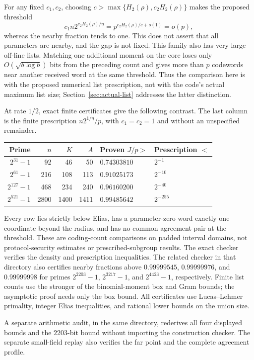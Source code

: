 For any fixed $c_1,c_2$, choosing
$c>\max\{H_2(\rho),c_2H_2(\rho)\}$ makes the proposed threshold
\[
 c_1n2^{c_2H_2(\rho)/\eta}=p^{c_2H_2(\rho)/c+o(1)}=o(p),
\]
whereas the nearby fraction tends to one. This does not assert that
all parameters are nearby, and the gap is not fixed.
This family also has very large off-line lists. Matching one additional
moment on the core loses only $O(\sqrt{b\log b})$ bits from the preceding
count and gives more than $p$ codewords near another received word at
the same threshold. Thus the comparison here is with the proposed
numerical list prescription, not with the code's actual maximum list
size; Section~\ref{sec:actual-list} addresses the latter distinction.

At rate $1/2$, exact finite certificates give the following contrast.
The last column is the finite prescription $n2^{1/\eta}/p$, with
$c_1=c_2=1$ and without an unspecified remainder.
\begin{center}
\begin{tabular}{@{}rrrrll@{}}
\toprule
Prime & $n$ & $K$ & $A$ & Proven $J/p>$ & Prescription $<$\\
\midrule
$2^{31}-1$&92&46&50&$0.74303810$&$2^{-1}$\\
$2^{61}-1$&216&108&113&$0.91025173$&$2^{-10}$\\
$2^{127}-1$&468&234&240&$0.96160200$&$2^{-40}$\\
$2^{521}-1$&2800&1400&1411&$0.99485642$&$2^{-255}$\\
\bottomrule
\end{tabular}
\end{center}
Every row lies strictly below Elias, has a parameter-zero word exactly
one coordinate beyond the radius, and has no common agreement pair at
the threshold. These are coding-count comparisons on padded interval
domains, not protocol-security estimates or prescribed-subgroup results.
The exact checker
 verifies the
density and prescription inequalities. The related checker
 in that directory also certifies
nearby fractions above $0.99999545$, $0.99999976$, and $0.99999998$
for primes $2^{2203}-1$, $2^{3217}-1$, and $2^{4423}-1$, respectively.
Finite list counts use the stronger of the binomial-moment box and Gram
bounds; the asymptotic proof needs only the box bound. All certificates
use Lucas--Lehmer primality, integer Elias inequalities,
and rational lower bounds on the union size.

A separate arithmetic audit,  in the
same directory, rederives all four displayed bounds and the $2203$-bit bound without
importing the construction checker. The separate small-field replay also verifies the far point and the
complete agreement profile.


